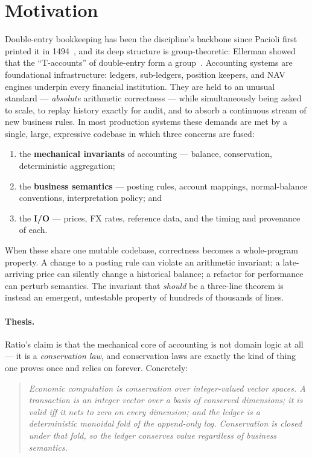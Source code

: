 \section{Motivation}
\label{sec:intro}

Double-entry bookkeeping has been the discipline's backbone since
Pacioli first printed it in 1494~\cite{pacioli1494summa}, and its
deep structure is group-theoretic: Ellerman showed that the
``T-accounts'' of double-entry form a group~\cite{ellerman1985mathematics}.
Accounting systems are foundational infrastructure: ledgers, sub-ledgers,
position keepers, and NAV engines underpin every financial institution.
They are held to an unusual standard --- \emph{absolute} arithmetic
correctness --- while simultaneously being asked to scale, to replay
history exactly for audit, and to absorb a continuous stream of new
business rules. In most production systems these demands are met by a
single, large, expressive codebase in which three concerns are fused:

\begin{enumerate}[leftmargin=1.4em,itemsep=2pt]
  \item the \textbf{mechanical invariants} of accounting --- balance,
        conservation, deterministic aggregation;
  \item the \textbf{business semantics} --- posting rules, account
        mappings, normal-balance conventions, interpretation policy; and
  \item the \textbf{I/O} --- prices, FX rates, reference data, and the
        timing and provenance of each.
\end{enumerate}

When these share one mutable codebase, correctness becomes a
whole-program property. A change to a posting rule can violate an
arithmetic invariant; a late-arriving price can silently change a
historical balance; a refactor for performance can perturb semantics.
The invariant that \emph{should} be a three-line theorem is instead an
emergent, untestable property of hundreds of thousands of lines.

\paragraph{Thesis.} Ratio's claim is that the mechanical core of
accounting is not domain logic at all --- it is a \emph{conservation
law}, and conservation laws are exactly the kind of thing one proves
once and relies on forever. Concretely:

\begin{quote}
\itshape Economic computation is conservation over integer-valued vector
spaces. A transaction is an integer vector over a basis of conserved
dimensions; it is valid iff it nets to zero on every dimension; and the
ledger is a deterministic monoidal fold of the append-only log.
Conservation is closed under that fold, so the ledger conserves value
regardless of business semantics.
\end{quote}

